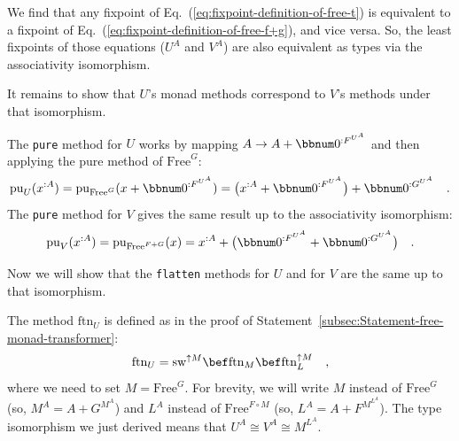 We find that any fixpoint of Eq.~(\ref{eq:fixpoint-definition-of-free-t})
is equivalent to a fixpoint of Eq.~(\ref{eq:fixpoint-definition-of-free-f+g}),
and vice versa. So, the least fixpoints of those equations ($U^{A}$
and $V^{A}$) are also equivalent as types via the associativity isomorphism.

It remains to show that $U$\textsf{'}s monad methods correspond to $V$\textsf{'}s
methods under that isomorphism.

The \lstinline!pure! method for $U$ works by mapping $A\rightarrow A+\bbnum 0^{:F^{U^{A}}}$
and then applying the pure method of $\text{Free}^{G}$:
\[
\text{pu}_{U}(x^{:A})=\text{pu}_{\text{Free}^{G}}(x+\bbnum 0^{:F^{U^{A}}})=\big(x^{:A}+\bbnum 0^{:F^{U^{A}}}\big)+\bbnum 0^{:G^{U^{A}}}\quad.
\]
The \lstinline!pure! method for $V$ gives the same result up to
the associativity isomorphism:
\[
\text{pu}_{V}(x^{:A})=\text{pu}_{\text{Free}^{F+G}}(x)=x^{:A}+\big(\bbnum 0^{:F^{U^{A}}}+\bbnum 0^{:G^{U^{A}}}\big)\quad.
\]

Now we will show that the \lstinline!flatten! methods for $U$ and
for $V$ are the same up to that isomorphism. 

The method $\text{ftn}_{U}$ is defined as in the proof of Statement~\ref{subsec:Statement-free-monad-transformer}:
\[
\text{ftn}_{U}=\text{sw}^{\uparrow M}\bef\text{ftn}_{M}\bef\text{ftn}_{L}^{\uparrow M}\quad,
\]
where we need to set $M=\text{Free}^{G}$. For brevity, we will write
$M$ instead of $\text{Free}^{G}$ (so, $M^{A}=A+G^{M^{A}}$) and
$L^{A}$ instead of $\text{Free}^{F\circ M}$ (so, $L^{A}=A+F^{M^{L^{A}}}$).
The type isomorphism we just derived means that $U^{A}\cong V^{A}\cong M^{L^{A}}$.

